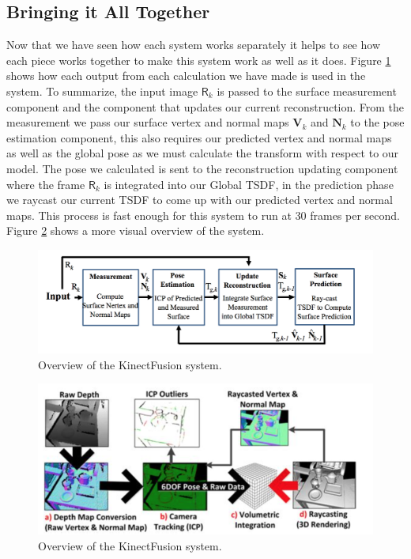 \documentclass[10pt, twocolumn]{article}
\begin{document}
\subsection{Bringing it All Together}
Now that we have seen how each system works separately it helps to see how each piece works together to make this system work as well as it does. Figure \ref{fig:workflow} shows how each output from each calculation we have made is used in the system. To summarize, the input image $\mathsf{R}_k$ is passed to the surface measurement component and the component that updates our current reconstruction. From the measurement we pass our surface vertex and normal maps $\mathbf{V}_k$ and $\mathbf{N}_k$ to the pose estimation component, this also requires our predicted vertex and normal maps as well as the global pose as we must calculate the transform with respect to our model. The pose we calculated is sent to the reconstruction updating component where the frame $\mathsf{R}_k$ is integrated into our Global TSDF, in the prediction phase we raycast our current TSDF to come up with our predicted vertex and normal maps. This process is fast enough for this system to run at 30 frames per second. Figure \ref{fig:visworkflow} shows a more visual overview of the system.

\begin{figure}
  \centering
  \includegraphics[width=1.0\linewidth]{workflow}
  \caption{Overview of the KinectFusion system.}
  \label{fig:workflow}
\end{figure}

\begin{figure}
  \centering
  \includegraphics[width=1.0\linewidth]{kinectfusion}
  \caption{Overview of the KinectFusion system.}
  \label{fig:visworkflow}
\end{figure}
\end{document}
